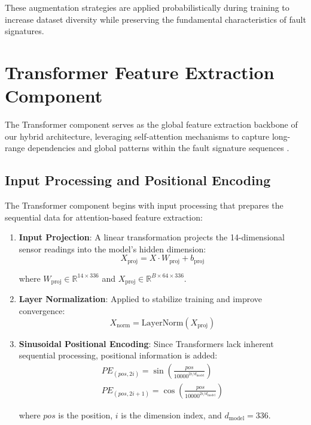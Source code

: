 These augmentation strategies are applied probabilistically during training to increase dataset diversity while preserving the fundamental characteristics of fault signatures.

\section{Transformer Feature Extraction Component}
\label{sec:hybrid_model:transformer_component}

The Transformer component serves as the global feature extraction backbone of our hybrid architecture, leveraging self-attention mechanisms to capture long-range dependencies and global patterns within the fault signature sequences \citep{vaswani2017attention, zhou2021informer}.

\subsection{Input Processing and Positional Encoding}
\label{subsec:input_processing}

The Transformer component begins with input processing that prepares the sequential data for attention-based feature extraction:

\begin{enumerate}
    \item \textbf{Input Projection}: A linear transformation projects the 14-dimensional sensor readings into the model's hidden dimension:
    \begin{equation}
X_{\text{proj}} = X \cdot W_{\text{proj}} + b_{\text{proj}}
\end{equation}

    where $W_{\text{proj}} \in \mathbb{R}^{14 \times 336}$ and $X_{\text{proj}} \in \mathbb{R}^{B \times 64 \times 336}$.
    
    \item \textbf{Layer Normalization}: Applied to stabilize training and improve convergence:
    \begin{equation}
X_{\text{norm}} = \text{LayerNorm}(X_{\text{proj}})
\end{equation}
    
    \item \textbf{Sinusoidal Positional Encoding}: Since Transformers lack inherent sequential processing, positional information is added:
    \begin{align}
PE_{(pos, 2i)} = \sin\left(\frac{pos}{10000^{2i/d_{\text{model}}}}\right) \\
PE_{(pos, 2i+1)} = \cos\left(\frac{pos}{10000^{2i/d_{\text{model}}}}\right)
\end{align}

    where $pos$ is the position, $i$ is the dimension index, and $d_{\text{model}} = 336$.
\end{enumerate}

